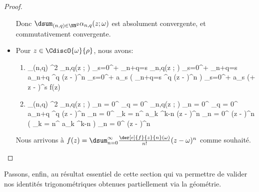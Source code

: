 \begin{proof}
\begin{itemize}
		\noindent
		Donc
		$\dsum_{(n,q) \in \NN^2} \alpha_{n,q}(z ; \omega)$
		est absolument convergente,
		et commutativement convergente.
	

		\item Pour $z \in \CdiscO{\omega}{\rho}$, nous avons:
		\begin{enumerate}
			\item
    		\begin{stepcalc}[style=sar]
    			\dsum_{(n,q) \in \NN^2} \alpha_{n,q}(z ; \omega)
    		\explnext{}
    			\dsum_{s=0}^{+\infty} \dsum_{n+q=s} \alpha_{n,q}(z ; \omega)
    		\explnext{}
    			\dsum_{s=0}^{+\infty} \dsum_{n+q=s}  a_{n+q} \omega^q (z - \omega)^n
    		\explnext{}
    			\dsum_{s=0}^{+\infty} a_s \big( \dsum_{n+q=s}  \omega^q (z - \omega)^n \big)
    		\explnext{}
    			\dsum_{s=0}^{+\infty} a_s (\omega + z - \omega)^s
    		\explnext{}
    			f(z)
    		\end{stepcalc}


			\item
    		\begin{stepcalc}[style=sar]
    			\dsum_{(n,q) \in \NN^2} \alpha_{n,q}(z ; \omega)
    		\explnext{}
    			\dsum_{n = 0}^{\infty} \dsum_{q = 0}^{\infty} \alpha_{n,q}(z ; \omega)
    		\explnext{}
    			\dsum_{n = 0}^{\infty} \dsum_{q = 0}^{\infty}  a_{n+q} \omega^q (z - \omega)^n
    		\explnext{}
    			\dsum_{n = 0}^{\infty} \dsum_{k = n}^{\infty}  a_{k} \omega^{k-n} (z - \omega)^n
    		\explnext{}
    			\dsum_{n = 0}^{\infty}  (z - \omega)^n \big( \dsum_{k = n}^{\infty}  a_{k} \omega^{k-n} \big) 
    		\explnext{}
    			\dsum_{n = 0}^{\infty}  (z - \omega)^n
    		\end{stepcalc}
		\end{enumerate}
		
		\noindent
		Nous arrivons à
		$f(z) = \dsum_{n = 0}^{\infty} \frac{\der[e]{f}{z}{n}(\omega)}{n!} (z - \omega)^n$
		comme souhaité.
	\end{itemize}
	
	\null\vspace{-2.25em}
\end{proof}




Passons, enfin, au résultat essentiel de cette section qui va permettre de valider nos identités trigonométriques obtenues partiellement via la géométrie.


